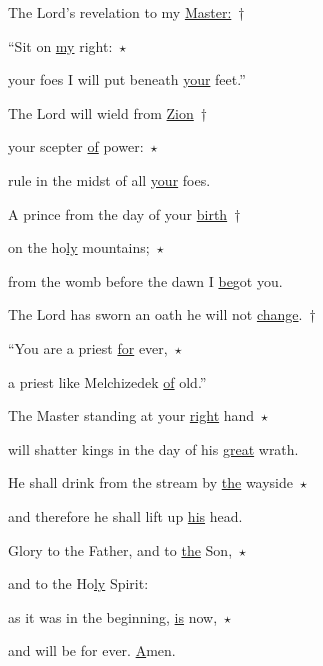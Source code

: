 
\noindent The Lord’s revelation to my \uline{Master:}~†~\nopagebreak

“Sit on \uline{my} right:~$\star$~\nopagebreak

your foes I will put beneath \uline{your} feet.”

\noindent The Lord will wield from \uline{Zion}~†~\nopagebreak

your scepter \uline{of} power:~$\star$~\nopagebreak

rule in the midst of all \uline{your} foes.

\noindent A prince from the day of your \uline{birth}~†~\nopagebreak

on the ho\uline{ly} mountains;~$\star$~\nopagebreak

from the womb before the dawn I \uline{be}got you.

\noindent The Lord has sworn an oath he will not \uline{change}.~†~\nopagebreak

“You are a priest \uline{for} ever,~$\star$~\nopagebreak

a priest like Melchizedek \uline{of} old.”

\noindent The Master standing at your \uline{right} hand~$\star$~\nopagebreak

will shatter kings in the day of his \uline{great} wrath.

\noindent He shall drink from the stream by \uline{the} wayside~$\star$~\nopagebreak

and therefore he shall lift up \uline{his} head.

\noindent Glory to the Father, and to \uline{the} Son,~$\star$~\nopagebreak

and to the Ho\uline{ly} Spirit:

\noindent as it was in the beginning, \uline{is} now,~$\star$~\nopagebreak

and will be for ever. \uline{A}men.
